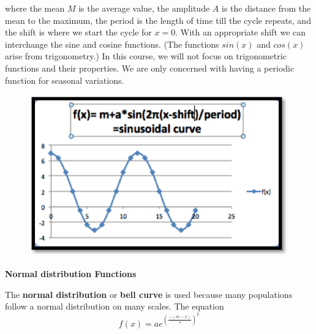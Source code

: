 \documentclass[10pt,]{book}
\newcommand{\terminology}[1]{\textbf{#1}}
\theoremstyle{plain}
\theoremstyle{definition}
\theoremstyle{definition}
\begin{document}
where the mean \(M\) is the average value, the amplitude \(A\) is the distance from the mean to the maximum, the period is the length of time till the cycle repeats, and the shift is where we start the cycle for \(x=0\).  
With an appropriate shift we can interchange the sine and cosine functions.  (The functions \(sin(x)\) and \(cos(x)\) arise from trigonometry.)  In this course, we will not focus on trigonometric functions and their properties.  We are only concerned with having a periodic function for seasonal variations.%
\leavevmode%
\begin{figure}
\centering
\includegraphics[width=0.5\linewidth]{images/sec1-2-SinCurve.png}
\end{figure}
\par
\terminology{Normal distribution Functions}%
\par
The \terminology{normal distribution} or \terminology{bell curve} is used because many populations follow a normal distribution on many scales.  The equation%
\begin{equation*}f(x)=a e^{\left(\frac{-(m-x)}{s}\right)^2} \end{equation*}\par
\end{document}
